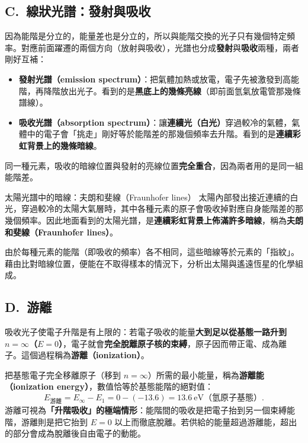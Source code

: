 \documentclass[11pt]{article}
\begin{document}
\subsection*{\sffamily C.\ 線狀光譜：發射與吸收}

因為能階是分立的，能量差也是分立的，所以與能階交換的光子只有幾個特定頻率。對應前面躍遷的兩個方向（放射與吸收），光譜也分成\textbf{發射}與\textbf{吸收}兩種，兩者剛好互補：

\begin{itemize}\setlength{\itemsep}{2pt}
\item \textbf{發射光譜（emission spectrum）}：把氣體加熱或放電，電子先被激發到高能階，再降階放出光子。看到的是\textbf{黑底上的幾條亮線}（即前面氫氣放電管那幾條譜線）。
\item \textbf{吸收光譜（absorption spectrum）}：讓\textbf{連續光（白光）}穿過較冷的氣體，氣體中的電子會「挑走」剛好等於能階差的那幾個頻率去升階。看到的是\textbf{連續彩虹背景上的幾條暗線}。
\end{itemize}

同一種元素，吸收的暗線位置與發射的亮線位置\textbf{完全重合}，因為兩者用的是同一組能階差。

\begin{補充框}{太陽光譜中的暗線：夫朗和斐線（Fraunhofer lines）}
太陽內部發出接近連續的白光，穿過較冷的太陽大氣層時，其中各種元素的原子會吸收掉對應自身能階差的那幾個頻率。因此地面看到的太陽光譜，是\textbf{連續彩虹背景上佈滿許多暗線}，稱為\textbf{夫朗和斐線（Fraunhofer lines）}。

由於每種元素的能階（即吸收的頻率）各不相同，這些暗線等於元素的「指紋」。藉由比對暗線位置，便能在不取得樣本的情況下，分析出太陽與遙遠恆星的化學組成。
\end{補充框}


\subsection*{\sffamily D.\ 游離}

吸收光子使電子升階是有上限的：若電子吸收的能量\textbf{大到足以從基態一路升到 $n=\infty$（$E=0$）}，電子就會\textbf{完全脫離原子核的束縛}，原子因而帶正電、成為離子。這個過程稱為\textbf{游離（ionization）}。

把基態電子完全移離原子（移到 $n=\infty$）所需的最小能量，稱為\textbf{游離能（ionization energy）}，數值恰等於基態能階的絕對值：
$$E_{\text{游離}} = E_\infty - E_1 = 0-(-13.6) = 13.6\ \text{eV（氫原子基態）}.$$
游離可視為\textbf{「升階吸收」的極端情形}：能階間的吸收是把電子抬到另一個束縛能階，游離則是把它抬到 $E=0$ 以上而徹底脫離。若供給的能量超過游離能，超出的部分會成為脫離後自由電子的動能。
\end{document}
